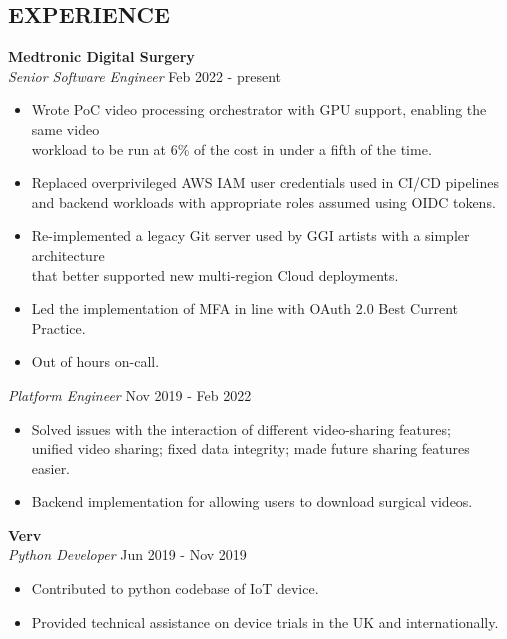 \documentclass[line,margin]{res}
\begin{document}
\begin{resume}
\section{EXPERIENCE} \textbf{Medtronic Digital Surgery} \\
                {\sl Senior Software Engineer} \hfill   Feb 2022 - present \\
                 \begin{itemize}  \itemsep  -0pt %
                   \item Wrote PoC video processing orchestrator with GPU support, enabling the same video \\
                         workload to be run at 6\% of the cost in under a fifth of the time.
                   \item Replaced overprivileged AWS IAM user credentials used in CI/CD pipelines \\
                         and backend workloads with appropriate roles assumed using OIDC tokens.
                   \item Re-implemented a legacy Git server used by GGI artists with a simpler architecture \\
                         that better supported new multi-region Cloud deployments.
                   \item Led the implementation of MFA in line with OAuth 2.0 Best Current Practice.
                   \item Out of hours on-call.
                 \end{itemize}
                {\sl Platform Engineer} \hfill          Nov 2019 - Feb 2022 \\
                  \begin{itemize}  \itemsep -0pt %
                  \item Solved issues with the interaction of different video-sharing features; \\
                        unified video sharing; fixed data integrity; made future sharing features easier.
                  \item Backend implementation for allowing users to download surgical videos.
                  \end{itemize}

                \textbf{Verv} \\
                {\sl Python Developer} \hfill        Jun 2019 - Nov 2019 \\
                  \begin{itemize} \itemsep -0pt %
                  \item Contributed to python codebase of IoT device.\
                  \item Provided technical assistance on device trials in the UK and internationally.
                  \end{itemize}


\end{resume}
\end{document}
